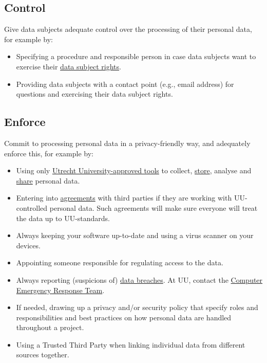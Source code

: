\documentclass[
]{book}
\providecommand{\tightlist}{%
  \setlength{\itemsep}{0pt}\setlength{\parskip}{0pt}}
\begin{document}
\hypertarget{control}{%
\subsection{Control}\label{control}}

Give data subjects adequate control over the processing of their personal data,
for example by:

\begin{itemize}
\tightlist
\item
  Specifying a procedure and responsible person in case data subjects want to
  exercise their \protect\hyperlink{data-subject-rights}{data subject rights}.
\item
  Providing data subjects with a contact point (e.g., email address) for
  questions and exercising their data subject rights.
\end{itemize}

\hypertarget{enforce}{%
\subsection{Enforce}\label{enforce}}

Commit to processing personal data in a privacy-friendly way, and adequately
enforce this, for example by:

\begin{itemize}
\tightlist
\item
  Using only \href{https://tools.uu.nl/}{Utrecht University-approved tools}
  to collect, \protect\hyperlink{data-storage}{store}, analyse and \protect\hyperlink{data-sharing-collaboration}{share}
  personal data.
\item
  Entering into \protect\hyperlink{agreements}{agreements} with third parties if they
  are working with UU-controlled personal data. Such agreements will make sure
  everyone will treat the data up to UU-standards.
\item
  Always keeping your software up-to-date and using a virus scanner on your devices.
\item
  Appointing someone responsible for regulating access to the data.
\item
  Always reporting (suspicions of)
  \href{https://intranet.uu.nl/en/knowledgebase/what-is-a-personal-data-breach}{data breaches}.
  At UU, contact the \href{https://intranet.uu.nl/en/security/information-security-computer-misuse-or-report-incident-cert}{Computer Emergency Response Team}.
\item
  If needed, drawing up a privacy and/or security policy that specify roles and
  responsibilities and best practices on how personal data are handled throughout
  a project.
\item
  Using a Trusted Third Party when linking individual data from different
  sources together.
\end{itemize}
\end{document}
